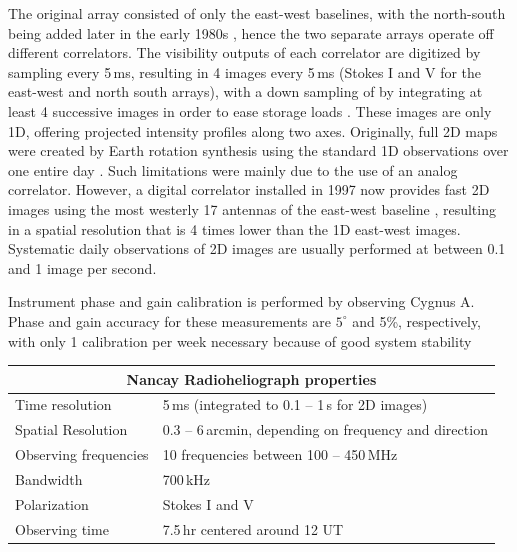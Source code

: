 
The original array consisted of only the east-west baselines, with the north-south being added later in the early 1980s \citep{bonmartin1983}, hence the two separate arrays operate off different correlators. The visibility outputs of each correlator are digitized by sampling every 5\,ms, resulting in 4 images every 5\,ms (Stokes I and V for the east-west and north south arrays), with a down sampling of by integrating at least 4 successive images in order to ease storage loads \citep{avignon1989}. These images are only 1D, offering projected intensity profiles along two axes. Originally, full 2D maps were created by Earth rotation synthesis using the standard 1D observations over one entire day \citep{nrh1993}. Such limitations were mainly due to the use of an analog correlator. However, a digital correlator installed in 1997 now provides fast 2D images using the most westerly 17 antennas of the east-west baseline \citep{kerdraon1997}, resulting in a spatial resolution that is 4 times lower than the 1D east-west images. Systematic daily observations of 2D images are usually performed at between 0.1 and 1 image per second.

Instrument phase and gain calibration is performed by observing Cygnus A. Phase and gain accuracy for these measurements are $5^{\circ}$ and 5\%, respectively, with only 1 calibration per week necessary because of good system stability \citep{avignon1989}

\begin{tabular}{ |l|l| }
  \hline
  \multicolumn{2}{|c|}{Nancay Radioheliograph properties} \\
  \hline
  Time resolution & 5\,ms (integrated to 0.1 -- 1\,s for 2D images) \\
  Spatial Resolution & 0.3 -- 6\,arcmin, depending on frequency and direction \\
  Observing frequencies & 10 frequencies between 100 -- 450\,MHz \\
  Bandwidth & 700\,kHz \\
  Polarization & Stokes I and V \\
  Observing time & 7.5\,hr centered around 12 UT \\
  \hline
\end{tabular}


